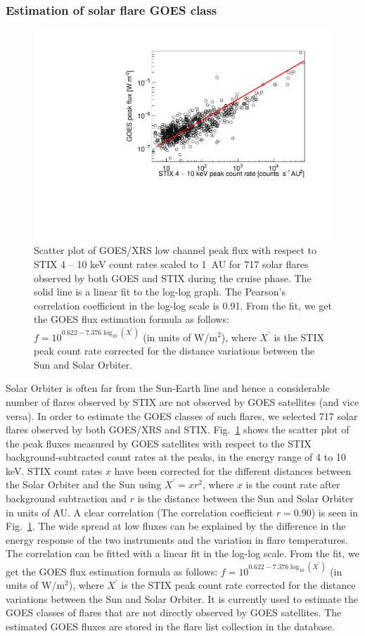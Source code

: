 \documentclass[referee]{preaa} %
\begin{document}
\subsubsection{Estimation of solar flare GOES class }
\begin{figure}
  \centering
  \includegraphics[width=0.8\linewidth]{figures/goes_stix_flux_paper.pdf}
  \caption{Scatter plot of GOES/XRS low channel peak flux with respect to STIX 4 -- 10 keV count rates scaled to 1~AU for 717 solar flares observed by both GOES and STIX during the cruise phase.   The solid line is a linear fit to the log-log graph.  The Pearson’s correlation coefficient  in the log-log scale is 0.91.   From the fit, we get the GOES flux estimation formula as follows: 
$f = 10^{0.622 -7.376 \log_{10} (X^{'})}$ (in units of W/m$^2$), where $X^{'}$ is the STIX peak count rate corrected for the distance variations between the Sun and Solar Orbiter. 
  }
\label{fig:goes-stix}
\end{figure}
Solar Orbiter is often far from the Sun-Earth line and hence a considerable number of flares observed by STIX 
are not observed by GOES satellites (and vice versa). 
In order to estimate the GOES classes of such flares,  we selected 717 solar flares observed by both GOES/XRS and STIX. 
Fig.~\ref{fig:goes-stix} shows the scatter plot of the peak fluxes
measured by GOES satellites with respect to the STIX background-subtracted count rates at the peaks, 
 in the energy range of 4 to 10 keV. 
STIX count rates $x$ have been corrected for 
the different distances between the Solar Orbiter and the Sun using $X^{'}=x r^2$,
where $x$ is the count rate after background subtraction
 and $r$ is the distance between the Sun and Solar Orbiter in units of AU.  A clear correlation (The correlation coefficient $r=0.90$) is seen in Fig.~\ref{fig:goes-stix}.  The wide spread at low fluxes can be explained by the difference in 
the energy response of the two instruments and the variation in flare temperatures. 
The correlation can be fitted with a linear fit in the log-log scale. 
From the fit, we get the GOES flux estimation formula as follows: 
$f = 10^{0.622 -7.376 \log_{10} (X^{'})}$ (in units of W/m$^2$), where $X^{'}$ is the STIX peak count rate corrected for the distance variations between the Sun and Solar Orbiter. It is currently used to estimate the GOES classes of flares that are not directly observed by GOES satellites.  The estimated GOES fluxes are stored in the flare list collection in the database. 
\end{document}
